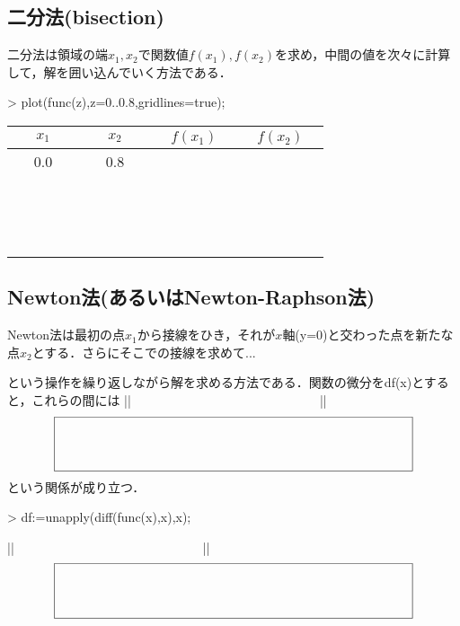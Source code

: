 \subsection{二分法(bisection)}
二分法は領域の端$x_1, x_2$で関数値$f(x_1),f(x_2)$を求め，中間の値を次々に計算して，解を囲い込んでいく方法である．
\begin{MapleInput}
> plot(func(z),z=0..0.8,gridlines=true);
\end{MapleInput}

\begin{table}[htbp]\begin{center}
\begin{tabular}{|c|c|c|c|}
\hline
$x_1$ & $x_2$ &$f(x_1)$ & $f(x_2)$ \\ \hline
0.0 & 0.8 &　　　　　 &　　　　　 \\ \hline
　　　　&  　　　　&  　　　　& 　　　　\\ \hline
　　　　&  　　　　&  　　　　& 　　　　\\ \hline
　　　　&  　　　　&  　　　　& 　　　　\\ \hline
\end{tabular}
\end{center}\label{default}\end{table}%


\subsection{Newton法(あるいはNewton-Raphson法)}
Newton法は最初の点$x_1$から接線をひき，それが$x$軸(y=0)と交わった点を新たな点$x_2$とする．さらにそこでの接線を求めて...

という操作を繰り返しながら解を求める方法である．関数の微分をdf(x)とすると，これらの間には
\ifHIKI %
||　　　　　　　　　　　　　　　||
\else %
\begin{equation*}
\setlength{\unitlength}{1cm}
\begin{picture}(10,1.5)
\put(0,0){\framebox(10,1.5){}}
\end{picture}
\end{equation*}
\fi %
という関係が成り立つ．
\begin{MapleInput}
> df:=unapply(diff(func(x),x),x);
\end{MapleInput}
\ifHIKI %
||　　　　　　　　　　　　　　　||
\else %
\begin{equation*}
\setlength{\unitlength}{1cm}
\begin{picture}(10,1.5)
\put(0,0){\framebox(10,1.5){}}
\end{picture}
\end{equation*}
\fi %

